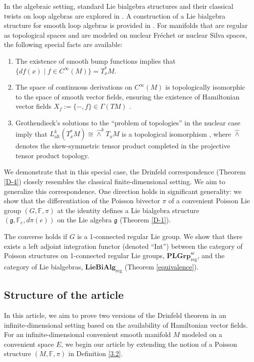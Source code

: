 \documentclass[11pt,reqno]{amsart}
\theoremstyle{definition}
\newcommand{\CatPL}{\mathbf{PLGrp}_{\text{reg}}^{\text{sc}}}
\newcommand{\CatLB}{\mathbf{LieBiAlg}_{\text{reg}}}
\numberwithin{equation}{section}
\begin{document}
In the algebraic setting, standard Lie bialgebra structures and their classical twists on loop algebras are explored in \cite{1, 2, 3}. A construction of a Lie bialgebra structure for smooth loop algebras is provided in \cite{23}. For manifolds that are regular as topological spaces and are modeled on nuclear Fréchet or nuclear Silva spaces, the following special facts are available:
\begin{enumerate}
    \item The existence of smooth bump functions \cite[16.10]{20} implies that $\{df(x) \mid f \in C^{\infty}(M)\} = T_{x}^*M$.
    \item The space of continuous derivations on $C^{\infty}(M)$ is topologically isomorphic to the space of smooth vector fields, ensuring the existence of Hamiltonian vector fields $X_{f} := \{-, f\} \in \Gamma(TM)$ \cite{30}.
    \item Grothendieck's solutions to the ``problem of topologies'' in the nuclear case imply that $L_{\text{alt}}^{k}(T_{x}^*M) \cong \hat{\wedge}^{k}T_{x}M$ is a topological isomorphism \cite[Corollary 2, 21.2]{17}, where $\hat{\wedge}$ denotes the skew-symmetric tensor product completed in the projective tensor product topology.
\end{enumerate}

We demonstrate that in this special case, the Drinfeld correspondence (Theorem \ref{D-4}) closely resembles the classical finite-dimensional setting. We aim to generalize this correspondence. One direction holds in significant generality: we show that the differentiation of the Poisson bivector $\pi$ of a convenient Poisson Lie group $(G, \mathbb{F}, \pi)$ at the identity defines a Lie bialgebra structure $(\mathfrak{g}, \mathbb{F}_e, d\pi(e))$ on the Lie algebra $\mathfrak{g}$ (Theorem \ref{D-1}).

The converse holds if $G$ is a 1-connected regular Lie group. We show that there exists a left adjoint integration functor (denoted ``Int'') between the category of Poisson structures on 1-connected regular Lie groups, $\CatPL$, and the category of Lie bialgebras, $\CatLB$ (Theorem \ref{equivalence}).


\subsection{Structure of the article}
In this article, we aim to prove two versions of the Drinfeld theorem in an infinite-dimensional setting based on the availability of Hamiltonian vector fields. For an infinite-dimensional convenient smooth manifold $M$ modeled on a convenient space $E$, we begin our article by extending the notion of a Poisson structure $(M, \mathbb{F}, \pi)$ in Definition \ref{3.2}. 
\end{document}
